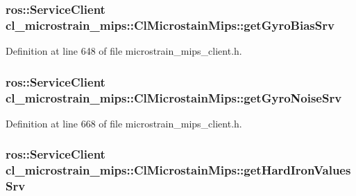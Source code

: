 \subsubsection[{\texorpdfstring{get\+Gyro\+Bias\+Srv}{getGyroBiasSrv}}]{\setlength{\rightskip}{0pt plus 5cm}ros\+::\+Service\+Client cl\+\_\+microstrain\+\_\+mips\+::\+Cl\+Microstain\+Mips\+::get\+Gyro\+Bias\+Srv\hspace{0.3cm}{\ttfamily [protected]}}\hypertarget{classcl__microstrain__mips_1_1ClMicrostainMips_a2f3eaec7f31a54d833773ebb5eb03b64}{}\label{classcl__microstrain__mips_1_1ClMicrostainMips_a2f3eaec7f31a54d833773ebb5eb03b64}


Definition at line 648 of file microstrain\+\_\+mips\+\_\+client.\+h.

\subsubsection[{\texorpdfstring{get\+Gyro\+Noise\+Srv}{getGyroNoiseSrv}}]{\setlength{\rightskip}{0pt plus 5cm}ros\+::\+Service\+Client cl\+\_\+microstrain\+\_\+mips\+::\+Cl\+Microstain\+Mips\+::get\+Gyro\+Noise\+Srv\hspace{0.3cm}{\ttfamily [protected]}}\hypertarget{classcl__microstrain__mips_1_1ClMicrostainMips_a7876569caf3e8169a1972ad8a591c772}{}\label{classcl__microstrain__mips_1_1ClMicrostainMips_a7876569caf3e8169a1972ad8a591c772}


Definition at line 668 of file microstrain\+\_\+mips\+\_\+client.\+h.

\subsubsection[{\texorpdfstring{get\+Hard\+Iron\+Values\+Srv}{getHardIronValuesSrv}}]{\setlength{\rightskip}{0pt plus 5cm}ros\+::\+Service\+Client cl\+\_\+microstrain\+\_\+mips\+::\+Cl\+Microstain\+Mips\+::get\+Hard\+Iron\+Values\+Srv\hspace{0.3cm}{\ttfamily [protected]}}\hypertarget{classcl__microstrain__mips_1_1ClMicrostainMips_a11169f770102e9cff7f3b45c96fb4881}{}\label{classcl__microstrain__mips_1_1ClMicrostainMips_a11169f770102e9cff7f3b45c96fb4881}


